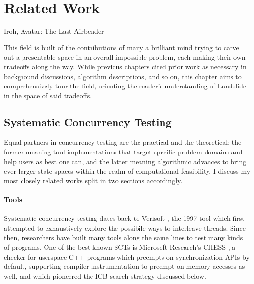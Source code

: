 \chapter{Related Work}
\label{chap:relatedwork}

{Iroh, Avatar: The Last Airbender}

This field is built of the contributions of many a brilliant mind
trying to carve out a presentable space in an overall impossible problem,
each making their own tradeoffs along the way.
While previous chapters cited prior work as necessary in background discussions, algorithm descriptions, and so on,
this chapter aims to comprehensively tour the field,
orienting the reader's understanding of Landslide in the space of said tradeoffs.

\section{Systematic Concurrency Testing}

Equal partners in concurrency testing are the practical and the theoretical:
the former meaning tool implementations that target specific problem domains and help users as best one can,
and the latter meaning algorithmic advances to bring ever-larger state spaces within the realm of computational feasibility.
I discuss my most closely related works split in two sections accordingly.

\subsubsection{Tools}

Systematic concurrency testing dates back to Verisoft \cite{verisoft},
the 1997 tool which first attempted to exhaustively explore the possibile ways to interleave threads.
Since then, researchers have built many tools along the same lines to test many kinds of programs.
One of the best-known SCTs is Microsoft Research's CHESS \cite{chess},
a checker for userspace C++ programs which preempts on synchronization APIs by default,
supporting compiler instrumentation to preempt on memory accesses as well,
and which pioneered the ICB search strategy discussed below.

